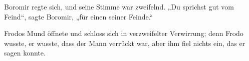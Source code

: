 Boromir regte sich, und seine Stimme war zweifelnd.
„Du sprichst gut vom Feind“, sagte Boromir, „für einen seiner Feinde.“

Frodos Mund öffnete und schloss sich in verzweifelter Verwirrung; denn Frodo wusste, er wusste, dass der Mann verrückt war, aber ihm fiel nichts ein, das er sagen konnte.

